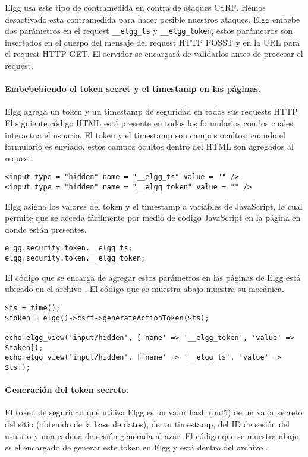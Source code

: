 Elgg usa este tipo de contramedida en contra de ataques CSRF.
Hemos desactivado esta contramedida para hacer posible nuestros ataques.
Elgg embebe dos parámetros en el request {\tt\_\_elgg\_ts} y {\tt\_\_elgg\_token}, estos parámetros son insertados en el cuerpo del mensaje del request HTTP POSST y en la URL para el request HTTP GET. El servidor se encargará de validarlos antes de procesar el request.


\paragraph{Embebebiendo el token secret y el timestamp en las páginas.}
Elgg agrega un token y un timestamp de seguridad en todos sus requests HTTP.
El siguiente código HTML está presente en todos los formularios con los cuales interactua el usuario.
El token y el timestamp son campos ocultos; cuando el formulario es enviado, estos campos ocultos dentro del HTML son agregados al request.

\begin{lstlisting}
<input type = "hidden" name = "__elgg_ts" value = "" />
<input type = "hidden" name = "__elgg_token" value = "" />
\end{lstlisting}

Elgg asigna los valores del token y el timestamp a variables de JavaScript, lo cual permite que se acceda fácilmente por medio de código JavaScript en la página en donde están presentes.

\begin{lstlisting}
elgg.security.token.__elgg_ts;
elgg.security.token.__elgg_token;
\end{lstlisting}

El código que se encarga de agregar estos parámetros en las páginas de Elgg está ubicado en el archivo . El código que se muestra abajo muestra su mecánica.

\begin{lstlisting}
$ts = time();
$token = elgg()->csrf->generateActionToken($ts);

echo elgg_view('input/hidden', ['name' => '__elgg_token', 'value' => $token]);
echo elgg_view('input/hidden', ['name' => '__elgg_ts', 'value' => $ts]);
\end{lstlisting}


\paragraph{Generación del token secreto.}
El token de seguridad que utiliza Elgg es un valor hash (md5) de un valor secreto del sitio (obtenido de la base de datos), de un timestamp, del ID de sesión del usuario y una cadena de sesión generada al azar.
El código que se muestra abajo es el encargado de generar este token en Elgg y está dentro del archivo .

